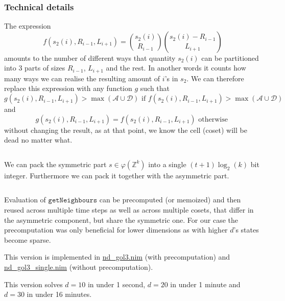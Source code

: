 \documentclass[]{article}
\newcommand{\ZZ}{\mathbb Z}
\newcommand{\calA}{\mathcal A}
\newcommand{\calD}{\mathcal D}
\begin{document}
	\subsubsection{Technical details}
	The expression
	$$f(s_2(i), R_{i-1}, L_{i+1}) = \binom{s_2(i)}{R_{i-1}}\binom{s_2(i) - R_{i-1}}{L_{i+1}}$$
	amounts to the number of different ways that quantity $s_2(i)$ can be partitioned into 3 parts of sizes $R_{i-1}$, $L_{i+1}$ and the rest. In another words it counts how many ways we can realise the resulting amount of $i$'s in $s_2$. We can therefore replace this expression with any function $g$ such that	
	$$g(s_2(i), R_{i-1}, L_{i+1}) > \max(\calA\cup\calD) \text{ if } f(s_2(i), R_{i-1}, L_{i+1}) > \max(\calA\cup\calD)$$
	and
	$$g(s_2(i), R_{i-1}, L_{i+1}) = f(s_2(i), R_{i-1}, L_{i+1}) \text{ otherwise }$$
	without changing the result, as at that point, we know the cell (coset) will be dead no matter what.
	
	$ $
	
	We can pack the symmetric part $s \in \varphi(\ZZ^k)$ into a single $(t+1)\log_2(k)$ bit integer. Furthermore we can pack it together with the asymmetric part.
	
	$ $
	
	Evaluation of $\texttt{getNeighbours}$ can be precomputed (or memoized) and then reused across multiple time steps as well as across multiple cosets, that differ in the asymmetric component, but share the symmetric one. For our case the precomputation was only beneficial for lower dimensions as with higher $d$'s states become sparse.
	
	This version is implemented in \href{https://github.com/MichalMarsalek/Advent-of-code/blob/master/2020/misc/day17-highdims/nd_gol3.nim}{nd\_gol3.nim} 
	(with precomputation) and \href{https://github.com/MichalMarsalek/Advent-of-code/blob/master/2020/misc/day17-highdims/nd_gol3\_single.nim}{nd\_gol3\_single.nim} (without precomputation).
	
	This version solves $d=10$ in under 1 second, $d=20$ in under 1 minute and $d=30$ in under 16 minutes.
	
	
\end{document}
